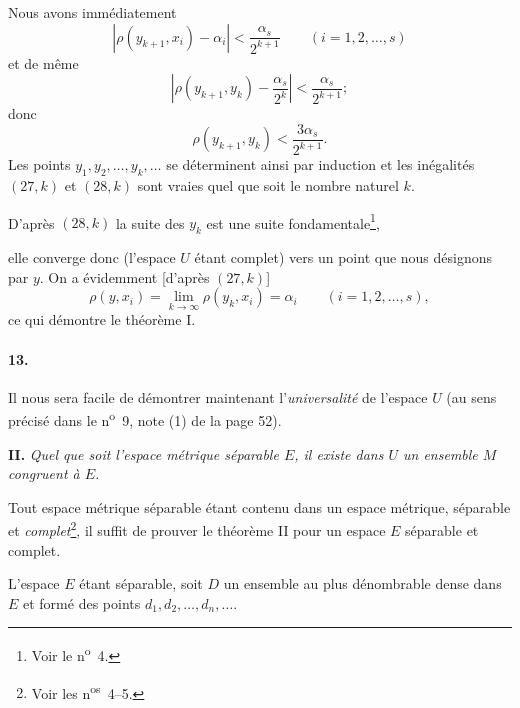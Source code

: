 \documentclass[a4paper,12pt]{amsart}
\newcommand{\srcpage}[1]{} %
\begin{document}
Nous avons immédiatement
\begin{equation}\tag{27, $k+1$}
|\rho(y_{k+1},x_i)-\alpha_i|<\frac{\alpha_s}{2^{k+1}}\qquad(i=1,2,\dots,s)
\end{equation}
et de même
\[
\left|\rho(y_{k+1},y_k)-\frac{\alpha_s}{2^k}\right|<\frac{\alpha_s}{2^{k+1}};
\]
donc
\begin{equation}\tag{28, $k+1$}
\rho(y_{k+1},y_k)<\frac{3\alpha_s}{2^{k+1}}.
\end{equation}
Les points $y_1,y_2,\dots,y_k,\dots$ se déterminent ainsi par induction et les inégalités $(27,k)$ et $(28,k)$ sont vraies quel que soit le nombre naturel $k$.

D'après $(28,k)$ la suite des $y_k$ est une suite fondamentale\footnote{Voir le n\textsuperscript{o}~4.},
\srcpage{63}
elle converge donc (l'espace $U$ étant complet) vers un point que nous désignons par $y$. On a évidemment [d'après $(27,k)$]
\[
\rho(y,x_i)=\lim_{k\to\infty}\rho(y_k,x_i)=\alpha_i\qquad(i=1,2,\dots,s),
\]
ce qui démontre le théorème I.

\paragraph{13.}
Il nous sera facile de démontrer maintenant l'\textit{universalité} de l'espace $U$ (au sens précisé dans le n\textsuperscript{o}~9, note (1) de la page 52).

\textbf{II.} \textit{Quel que soit l'espace métrique séparable $E$, il existe dans $U$ un ensemble $M$ congruent à $E$.}

Tout espace métrique séparable étant contenu dans un espace métrique, séparable et \textit{complet}\footnote{Voir les n\textsuperscript{os}~4--5.}, il suffit de prouver le théorème II pour un espace $E$ séparable et complet.

L'espace $E$ étant séparable, soit $D$ un ensemble au plus dénombrable dense dans $E$ et formé des points $d_1,d_2,\dots,d_n,\dots$.
\end{document}
